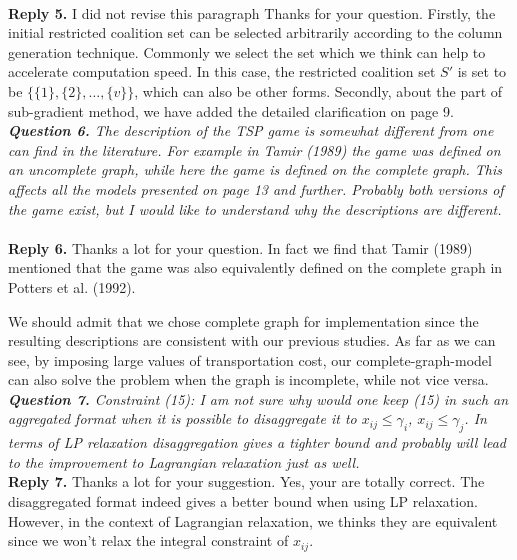 \documentclass[11pt]{article}
\begin{document}
~\\[2mm]
\noindent \textbf{Reply 5.}
I did not revise this paragraph
Thanks for your question. Firstly, the initial restricted coalition set can be selected arbitrarily according to the column generation technique. Commonly we select the set which we think can help to accelerate computation speed. In this case, the restricted coalition set $S'$ is set to be $\{\{1\},\{2\},\ldots, \{v\}\}$, which can also be other forms.
Secondly, about the part of sub-gradient method, we have added the detailed clarification on page 9.
\\[4mm]
%
%
\noindent \textit{\textbf{Question 6.}
The description of the TSP game is somewhat different from one can find in the literature. For example in Tamir (1989) the game was defined on an uncomplete graph, while here the game is defined on the complete graph. This affects all the models presented on page 13 and further. Probably both versions of the game exist, but I would like to understand why the descriptions are different.}
~\\[2mm]
\noindent \textbf{Reply 6.}
Thanks a lot for your question.
In fact we find that Tamir (1989) mentioned that the game was also equivalently defined on the complete graph in Potters et al. (1992).

We should admit that we chose complete graph for implementation since the resulting descriptions are consistent with our previous studies.
As far as we can see, by imposing large values of transportation cost, our complete-graph-model can also solve the problem when the graph is incomplete, while not vice versa.
\\[4mm]
\noindent \textit{\textbf{Question 7.}
Constraint (15): I am not sure why would one keep (15) in such an aggregated format when it is possible to disaggregate it to $x_{ij} \leq \gamma_i$, $x_{ij} \leq \gamma_j$. In terms of LP relaxation disaggregation gives a tighter bound and probably will lead to the improvement to Lagrangian relaxation just as well.}
\\[2mm]
\noindent \textbf{Reply 7.}
Thanks a lot for your suggestion.
Yes, your are totally correct. The disaggregated format indeed gives a better bound when using LP relaxation.
However, in the context of Lagrangian relaxation, we thinks they are equivalent since we won't relax the integral constraint of $x_{ij}$.
\end{document}
